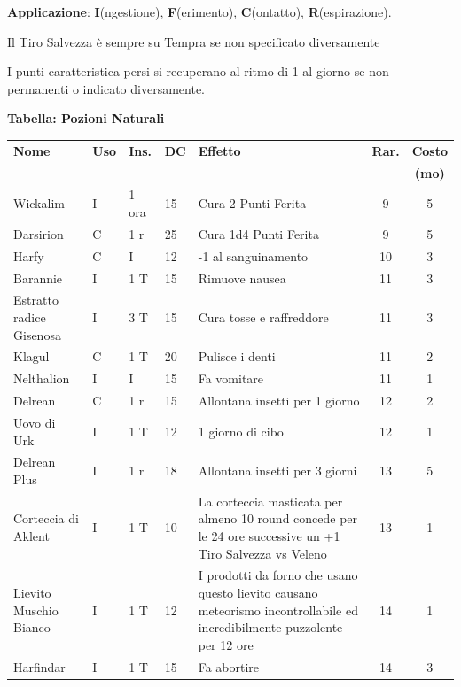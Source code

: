 \medskip

\textbf{Applicazione}: \textbf{I}(ngestione), \textbf{F}(erimento), \textbf{C}(ontatto), \textbf{R}(espirazione).

Il Tiro Salvezza è sempre su Tempra se non specificato diversamente

I punti caratteristica persi si recuperano al ritmo di 1 al giorno se non permanenti o indicato diversamente.

\medskip

\textbf{Tabella: Pozioni Naturali}\label{tabellapozioni}

\medskip

\noindent\begin{xltabular}{\linewidth}{llllXcc}
	\toprule
 \textbf{Nome}& \textbf{Uso} & \textbf{Ins.} & \textbf{DC} & \textbf{Effetto}& \textbf{Rar.} & \textbf{Costo} \\
 &&&&&&\textbf{(mo)}\\
 	\toprule
	Wickalim & I& 1 ora& 15& Cura 2 Punti Ferita& 9 & 5 \\
 Darsirion & C& 1 r & 25& Cura 1d4 Punti Ferita& 9 & 5 \\
	Harfy & C& I & 12& -1 al sanguinamento& 10 & 3 \\
 Barannie & I& 1 T& 15& Rimuove nausea & 11 & 3 \\
	Estratto radice Gisenosa & I& 3 T& 15& Cura tosse e raffreddore& 11 & 3\\
 Klagul & C& 1 T & 20& Pulisce i denti & 11 & 2 \\
	Nelthalion & I& I& 15& Fa vomitare& 11 & 1\\
 Delrean & C& 1 r & 15& Allontana insetti per 1 giorno & 12 & 2\\
	Uovo di Urk & I& 1 T & 12& 1 giorno di cibo& 12 & 1\\
 Delrean Plus & I& 1 r & 18& Allontana insetti per 3 giorni & 13 & 5\\
	Corteccia di Aklent & I& 1 T & 10& La corteccia masticata per almeno 10 round concede per le 24 ore successive un +1 Tiro Salvezza vs Veleno& 13 & 1\\
 Lievito Muschio Bianco & I& 1 T& 12& I prodotti da forno che usano questo lievito causano meteorismo incontrollabile ed incredibilmente puzzolente per 12 ore & 14 & 1\\
	Harfindar & I& 1 T & 15& Fa abortire& 14 & 3 \\

\end{xltabular}
